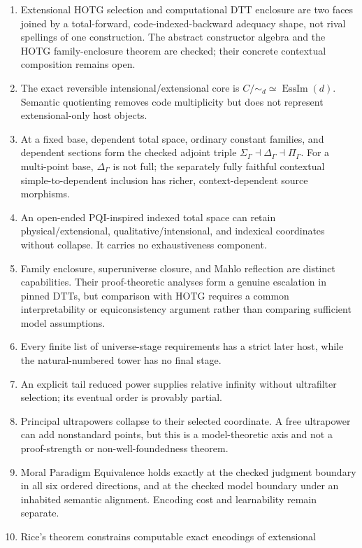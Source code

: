 \documentclass[11pt]{article}
\theoremstyle{definition}
\theoremstyle{remark}
\begin{document}
\begin{enumerate}
  same-level self-coding remains impossible in the predicative model.
\item Extensional HOTG selection and computational DTT enclosure are two faces
  joined by a total-forward, code-indexed-backward adequacy shape, not
  rival spellings of one construction.  The abstract constructor algebra and
  the HOTG family-enclosure theorem are checked; their concrete contextual
  composition remains open.
\item The exact reversible intensional/extensional core is
  $C/{\sim_d}\simeq\operatorname{EssIm}(d)$.  Semantic quotienting removes
  code multiplicity but does not represent extensional-only host objects.
\item At a fixed base, dependent total space, ordinary constant families, and
  dependent sections form the checked adjoint triple
  $\Sigma_\Gamma\dashv\Delta_\Gamma\dashv\Pi_\Gamma$.  For a multi-point
  base, $\Delta_\Gamma$ is not full; the separately fully faithful contextual
  simple-to-dependent inclusion has richer, context-dependent source morphisms.
\item An open-ended PQI-inspired indexed total space can retain
  physical/extensional, qualitative/intensional, and indexical coordinates
  without collapse.  It carries no exhaustiveness component.
\item Family enclosure, superuniverse closure, and Mahlo reflection are distinct
  capabilities.  Their proof-theoretic analyses form a genuine escalation in
  pinned DTTs, but comparison with HOTG requires a common interpretability or
  equiconsistency argument rather than comparing sufficient model assumptions.
\item Every finite list of universe-stage requirements has a strict later host,
  while the natural-numbered tower has no final stage.
\item An explicit tail reduced power supplies relative infinity without
  ultrafilter selection; its eventual order is provably partial.
\item Principal ultrapowers collapse to their selected coordinate.  A free
  ultrapower can add nonstandard points, but this is a model-theoretic axis and
  not a proof-strength or non-well-foundedness theorem.
\item Moral Paradigm Equivalence holds exactly at the checked judgment boundary
  in all six ordered directions, and at the checked model boundary under an
  inhabited semantic alignment.  Encoding cost and learnability remain separate.
\item Rice's theorem constrains computable exact encodings of extensional

\end{enumerate}
\end{document}
